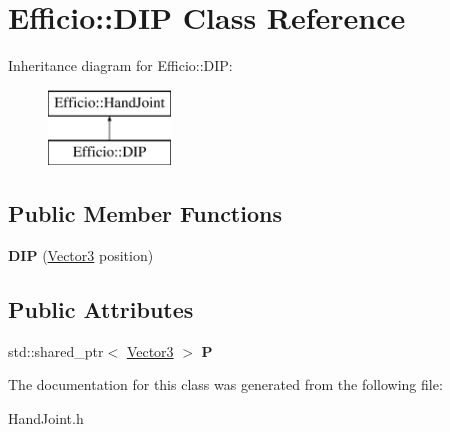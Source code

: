 \hypertarget{class_efficio_1_1_d_i_p}{}\section{Efficio\+:\+:D\+IP Class Reference}
\label{class_efficio_1_1_d_i_p}
Inheritance diagram for Efficio\+:\+:D\+IP\+:\begin{figure}[H]
\begin{center}
\leavevmode
\includegraphics[height=2.000000cm]{class_efficio_1_1_d_i_p}
\end{center}
\end{figure}
\subsection*{Public Member Functions}
\begin{DoxyCompactItemize}
\item 
{\bfseries D\+IP} (\hyperlink{class_efficio_1_1_vector3}{Vector3} position)\hypertarget{class_efficio_1_1_d_i_p_a75b38a33774d216c9ba69a5cd66e3b41}{}\label{class_efficio_1_1_d_i_p_a75b38a33774d216c9ba69a5cd66e3b41}

\end{DoxyCompactItemize}
\subsection*{Public Attributes}
\begin{DoxyCompactItemize}
\item 
std\+::shared\+\_\+ptr$<$ \hyperlink{class_efficio_1_1_vector3}{Vector3} $>$ {\bfseries P}\hypertarget{class_efficio_1_1_d_i_p_aaed45c98a689a70251505c604ab1f06b}{}\label{class_efficio_1_1_d_i_p_aaed45c98a689a70251505c604ab1f06b}

\end{DoxyCompactItemize}


The documentation for this class was generated from the following file\+:\begin{DoxyCompactItemize}
\item 
Hand\+Joint.\+h\end{DoxyCompactItemize}
